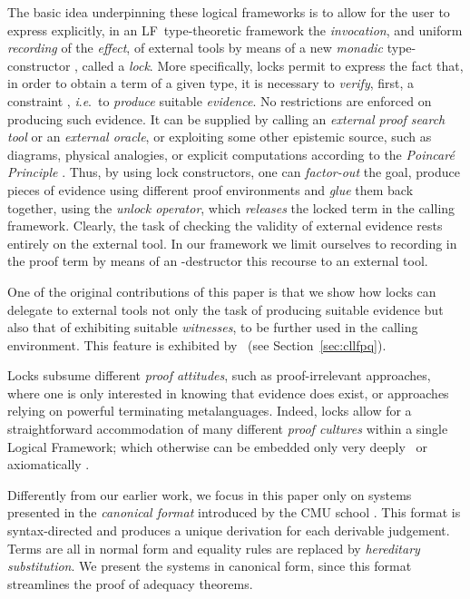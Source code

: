 \documentclass[submission,copyright,creativecommons]{eptcs}
\theoremstyle{plain}
\theoremstyle{definition}
\newcommand{\LF}  {\mbox{}}
\newcommand{\CLLFPQ} {\mbox{}}
\newcommand {\ie}        {{\textit{i}.\textit{e}.}}
\def \LF	{\mbox {{\sf LF}}}
\begin{document}
The basic idea underpinning these logical frameworks is to allow for
the user to express explicitly, in an \LF\ type-theoretic framework
the \emph{invocation}, and uniform \emph{recording} of the
\emph{effect}, of external tools by means of a new \emph{monadic}
type-constructor , called a \emph{lock}.
More specifically, locks permit to express the fact that, in order to
obtain a term of a given type, it is necessary to \emph{verify},
first, a constraint , \ie\ to
\emph{produce} suitable \emph{evidence}. No restrictions are enforced
on producing such evidence. It can be supplied by calling an
\emph{external proof search tool} or an \emph{external oracle}, or
exploiting some other epistemic source, such as diagrams, physical
analogies, or explicit computations according to the \emph{Poincar\'e
  Principle} \cite{bar02}. Thus, by using lock constructors, one can
\emph{factor-out} the goal, produce pieces of evidence using different
proof environments and \emph{glue} them back together, using the
\emph{unlock operator}, which \emph{releases} the locked term in the
calling framework. Clearly, the task of checking the validity of
external evidence rests entirely on the external tool. In our
framework we limit ourselves to recording in the proof term by means
of an -destructor this recourse to an external tool.

One of the original contributions of this paper is that we show how
locks can delegate to external tools not only the task of producing
suitable evidence but also that of exhibiting suitable
\emph{witnesses}, to be further used in the calling environment. This
feature is exhibited by \CLLFPQ\ (see Section~\ref{sec:cllfpq}).

Locks subsume different \emph{proof attitudes}, such as
proof-irrelevant approaches, where one is only interested in knowing
that evidence does exist, or approaches relying on powerful
terminating metalanguages. Indeed, locks allow for a straightforward
accommodation of many different \emph{proof cultures} within a single
Logical Framework; which otherwise can be embedded only very
deeply~\cite{deep,hirschkoff:bisimproofs} or axiomatically
\cite{HMS-01}.

Differently from our earlier work, we focus in this paper only on
systems presented in the \emph{canonical format} introduced by the CMU
school \cite{watkins-02,HarperLicata-jfp-07}. This format is
syntax-directed and produces a unique derivation for each derivable
judgement. Terms are all in normal form and equality rules are
replaced by \emph{hereditary substitution}. We present the systems in
canonical form, since this format streamlines the proof of adequacy
theorems.
\end{document}
